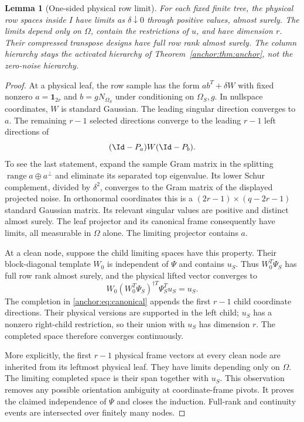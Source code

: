\documentclass[11pt,oneside,openany,a4paper]{book}
\numberwithin{equation}{chapter}
\newtheorem{lemma}[theorem]{Lemma}
\theoremstyle{definition}
\theoremstyle{remark}
\DeclareMathOperator{\ran}{range}\DeclareMathOperator{\OPT}{OPT}
\begin{document}
\begin{lemma}[One-sided physical row limit]\label{anchor:lem:rowlimit}
For each fixed finite tree, the physical row spaces inside $I$ have limits as $\delta\downarrow0$ through positive values, almost surely. The limits depend only on $\Omega$, contain the restrictions of $u$, and have dimension $r$. Their compressed transpose designs have full row rank almost surely. The column hierarchy stays the activated hierarchy of Theorem~\ref{anchor:thm:anchor}, not the zero-noise hierarchy.
\end{lemma}
\begin{proof}
At a physical leaf, the row sample has the form $ab^T+\delta W$ with fixed nonzero $a=\mathbf1_{2r}$ and $b=gN_{\Omega_S}$ under conditioning on $\Omega_S,g$. In nullspace coordinates, $W$ is standard Gaussian. The leading singular direction converges to $a$. The remaining $r-1$ selected directions converge to the leading $r-1$ left directions of
\[
 (\Id-P_a)W(\Id-P_b).
\]
To see the last statement, expand the sample Gram matrix in the splitting $\ran a\oplus a^\perp$ and eliminate its separated top eigenvalue. Its lower Schur complement, divided by $\delta^2$, converges to the Gram matrix of the displayed projected noise. In orthonormal coordinates this is a $(2r-1)\times(q-2r-1)$ standard Gaussian matrix. Its relevant singular values are positive and distinct almost surely. The leaf projector and its canonical frame consequently have limits, all measurable in $\Omega$ alone. The limiting projector contains $a$.

At a clean node, suppose the child limiting spaces have this property. Their block-diagonal template $W_0$ is independent of $\Psi$ and contains $u_S$. Thus $W_0^T\Psi_S$ has full row rank almost surely, and the physical lifted vector converges to
\[
 W_0(W_0^T\Psi_S)^{\dagger T}\Psi_S^Tu_S=u_S.
\]
The completion in \eqref{anchor:eq:canonical} appends the first $r-1$ child coordinate directions. Their physical versions are supported in the left child; $u_S$ has a nonzero right-child restriction, so their union with $u_S$ has dimension $r$. The completed space therefore converges continuously.

More explicitly, the first $r-1$ physical frame vectors at every clean node are inherited from its leftmost physical leaf. They have limits depending only on $\Omega$. The limiting completed space is their span together with $u_S$. This observation removes any possible orientation ambiguity at coordinate-frame pivots. It proves the claimed independence of $\Psi$ and closes the induction. Full-rank and continuity events are intersected over finitely many nodes.
\end{proof}
\end{document}
